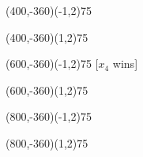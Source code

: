 \documentclass[12pt]{article}
\begin{document}
\begin{figure}[htb]
\begin{egame}
\putbranch(400,-360)(-1,2){75}

\renewcommand{\egarrowstyle}{}

\putbranch(400,-360)(1,2){75}






\renewcommand{\egarrowstyle}{e}

\putbranch(600,-360)(-1,2){75}
[$x_4$ wins]

\renewcommand{\egarrowstyle}{}

\putbranch(600,-360)(1,2){75}




\renewcommand{\egarrowstyle}{e}

\putbranch(800,-360)(-1,2){75}

\renewcommand{\egarrowstyle}{}

\putbranch(800,-360)(1,2){75}






\end{egame}
\end{figure}
\end{document}
